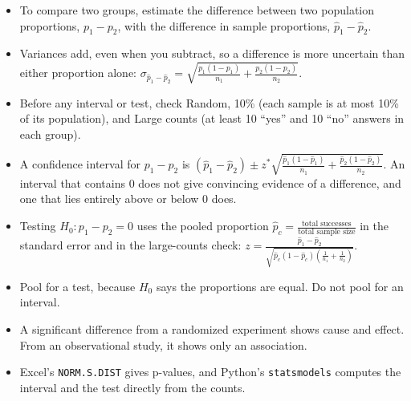\begin{mdframed}[style=important, frametitle={Key Ideas}]
\begin{itemize}
\item To compare two groups, estimate the difference between two population proportions, $p_1 - p_2$, with the difference in sample proportions, $\hat{p}_1 - \hat{p}_2$.
\item Variances add, even when you subtract, so a difference is more uncertain than either proportion alone: $\sigma_{\hat{p}_1 - \hat{p}_2} = \sqrt{\frac{p_1(1-p_1)}{n_1} + \frac{p_2(1-p_2)}{n_2}}$.
\item Before any interval or test, check Random, 10\% (each sample is at most 10\% of its population), and Large counts (at least 10 ``yes'' and 10 ``no'' answers in each group).
\item A confidence interval for $p_1 - p_2$ is $(\hat{p}_1 - \hat{p}_2) \pm z^*\sqrt{\frac{\hat{p}_1(1-\hat{p}_1)}{n_1} + \frac{\hat{p}_2(1-\hat{p}_2)}{n_2}}$. An interval that contains 0 does not give convincing evidence of a difference, and one that lies entirely above or below 0 does.
\item Testing $H_0: p_1 - p_2 = 0$ uses the pooled proportion $\hat{p}_c = \frac{\text{total successes}}{\text{total sample size}}$ in the standard error and in the large-counts check: $z = \frac{\hat{p}_1 - \hat{p}_2}{\sqrt{\hat{p}_c(1-\hat{p}_c)\left(\frac{1}{n_1} + \frac{1}{n_2}\right)}}$.
\item Pool for a test, because $H_0$ says the proportions are equal. Do not pool for an interval.
\item A significant difference from a randomized experiment shows cause and effect. From an observational study, it shows only an association.
\item Excel's \texttt{NORM.S.DIST} gives p-values, and Python's \texttt{statsmodels} computes the interval and the test directly from the counts.
\end{itemize}
\end{mdframed}
